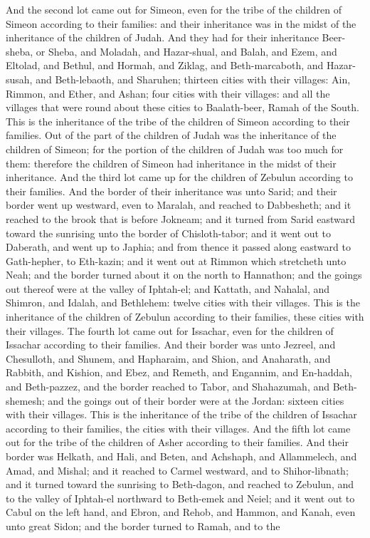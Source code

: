 And the second lot came out for Simeon, even for the tribe of the children of Simeon according to their families: and their inheritance was in the midst of the inheritance of the children of Judah. And they had for their inheritance Beer-sheba, or Sheba, and Moladah, and Hazar-shual, and Balah, and Ezem, and Eltolad, and Bethul, and Hormah, and Ziklag, and Beth-marcaboth, and Hazar-susah, and Beth-lebaoth, and Sharuhen; thirteen cities with their villages: Ain, Rimmon, and Ether, and Ashan; four cities with their villages: and all the villages that were round about these cities to Baalath-beer, Ramah of the South. This is the inheritance of the tribe of the children of Simeon according to their families. Out of the part of the children of Judah was the inheritance of the children of Simeon; for the portion of the children of Judah was too much for them: therefore the children of Simeon had inheritance in the midst of their inheritance.  And the third lot came up for the children of Zebulun according to their families. And the border of their inheritance was unto Sarid; and their border went up westward, even to Maralah, and reached to Dabbesheth; and it reached to the brook that is before Jokneam; and it turned from Sarid eastward toward the sunrising unto the border of Chisloth-tabor; and it went out to Daberath, and went up to Japhia; and from thence it passed along eastward to Gath-hepher, to Eth-kazin; and it went out at Rimmon which stretcheth unto Neah; and the border turned about it on the north to Hannathon; and the goings out thereof were at the valley of Iphtah-el; and Kattath, and Nahalal, and Shimron, and Idalah, and Bethlehem: twelve cities with their villages. This is the inheritance of the children of Zebulun according to their families, these cities with their villages.  The fourth lot came out for Issachar, even for the children of Issachar according to their families. And their border was unto Jezreel, and Chesulloth, and Shunem, and Hapharaim, and Shion, and Anaharath, and Rabbith, and Kishion, and Ebez, and Remeth, and Engannim, and En-haddah, and Beth-pazzez, and the border reached to Tabor, and Shahazumah, and Beth-shemesh; and the goings out of their border were at the Jordan: sixteen cities with their villages. This is the inheritance of the tribe of the children of Issachar according to their families, the cities with their villages.  And the fifth lot came out for the tribe of the children of Asher according to their families. And their border was Helkath, and Hali, and Beten, and Achshaph, and Allammelech, and Amad, and Mishal; and it reached to Carmel westward, and to Shihor-libnath; and it turned toward the sunrising to Beth-dagon, and reached to Zebulun, and to the valley of Iphtah-el northward to Beth-emek and Neiel; and it went out to Cabul on the left hand, and Ebron, and Rehob, and Hammon, and Kanah, even unto great Sidon; and the border turned to Ramah, and to the 
